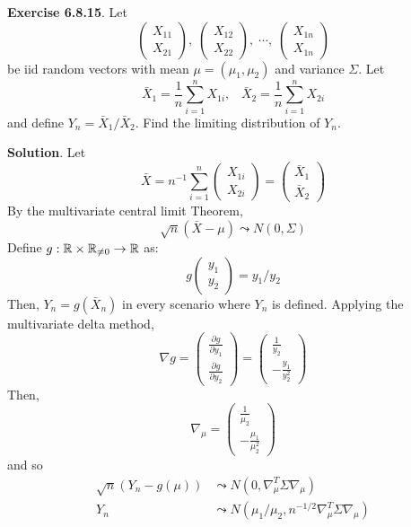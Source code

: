 \textbf{Exercise 6.8.15}. Let
\[
\begin{pmatrix} X_{11} \\ X_{21} \end{pmatrix}, \;
\begin{pmatrix} X_{12} \\ X_{22} \end{pmatrix}, \;
\cdots, \;
\begin{pmatrix} X_{1n} \\ X_{1n} \end{pmatrix}
\]
be iid random vectors with mean \(\mu = (\mu_{1}, \mu_{2})\) and variance
\(\Sigma\).
Let
\[
\bar{X}_{1} = \frac{1}{n}\sum_{i=1}^{n} X_{1i}, \; \; \;
\bar{X}_{2} = \frac{1}{n}\sum_{i=1}^{n} X_{2i}
\]
and define \(Y_{n} = \bar{X}_{1} \big/ \bar{X}_{2}\). Find the
limiting distribution of \(Y_{n}\).

\textbf{Solution}.
Let
\[
\bar{X} = n^{-1} \sum_{i=1}^{n} \begin{pmatrix} X_{1i} \\ X_{2i} \end{pmatrix} = \begin{pmatrix} \bar{X}_{1} \\ \bar{X}_{2} \end{pmatrix}
\]
By the multivariate central limit Theorem,
\[
\sqrt{n}(\bar{X} - \mu) \leadsto N(0, \Sigma)
\]
Define
\(g: \mathbb{R} \times \mathbb{R}_{\neq 0} \rightarrow \mathbb{R}\) as:
\[
g \begin{pmatrix} y_{1} \\ y_{2} \end{pmatrix} = y_{1} / y_{2}
\]
Then, \(Y_{n} = g(\bar{X}_{n})\) in every scenario where \(Y_{n}\) is
defined.
Applying the multivariate delta method,
\[
\nabla g 
= \begin{pmatrix} \frac{\partial g}{\partial y_{1}} \\ \frac{\partial g}{\partial y_{2}} \end{pmatrix} 
= \begin{pmatrix} \frac{1}{y_{2}} \\ -\frac{y_{1}}{y_{2}^{2}} \end{pmatrix} 
\]
Then,
\[
\nabla_\mu 
= \begin{pmatrix} \frac{1}{\mu_{2}} \\ -\frac{\mu_{1}}{\mu_{2}^{2}} \end{pmatrix} 
\]
and so
\begin{align*}
\sqrt{n}(Y_{n} - g(\mu)) 
& \leadsto N(0, \nabla_\mu^T \Sigma \nabla_\mu)
\\
Y_{n} 
& \leadsto N(\mu_{1} / \mu_{2}, n^{-1/2} \nabla_\mu^T \Sigma \nabla_\mu) 
\end{align*}
